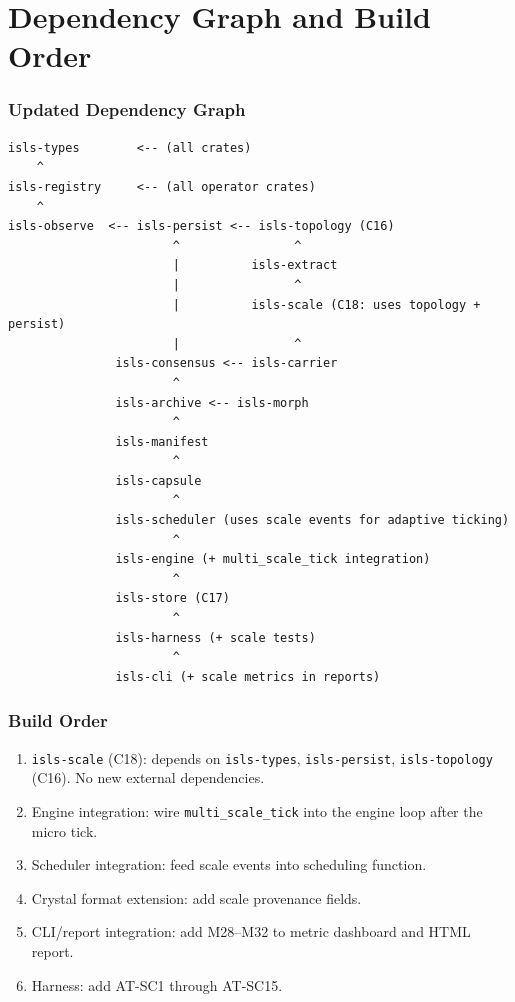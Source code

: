 \documentclass[11pt,a4paper,twoside]{article}
\theoremstyle{definition}
\theoremstyle{plain}
\theoremstyle{remark}
\begin{document}
\part{Dependency Graph and Build Order}\label{part:deps}

\section{Updated Dependency Graph}

\begin{verbatim}
isls-types        <-- (all crates)
    ^
isls-registry     <-- (all operator crates)
    ^
isls-observe  <-- isls-persist <-- isls-topology (C16)
                       ^                ^
                       |          isls-extract
                       |                ^
                       |          isls-scale (C18: uses topology + persist)
                       |                ^
               isls-consensus <-- isls-carrier
                       ^
               isls-archive <-- isls-morph
                       ^
               isls-manifest
                       ^
               isls-capsule
                       ^
               isls-scheduler (uses scale events for adaptive ticking)
                       ^
               isls-engine (+ multi_scale_tick integration)
                       ^
               isls-store (C17)
                       ^
               isls-harness (+ scale tests)
                       ^
               isls-cli (+ scale metrics in reports)
\end{verbatim}

\section{Build Order}

\begin{enumerate}[nosep]
  \item \texttt{isls-scale} (C18): depends on \texttt{isls-types},
        \texttt{isls-persist}, \texttt{isls-topology} (C16).
        No new external dependencies.
  \item Engine integration: wire \texttt{multi\_scale\_tick} into the
        engine loop after the micro tick.
  \item Scheduler integration: feed scale events into scheduling
        function.
  \item Crystal format extension: add scale provenance fields.
  \item CLI/report integration: add M28--M32 to metric dashboard and
        HTML report.
  \item Harness: add AT-SC1 through AT-SC15.
\end{enumerate}
\end{document}
